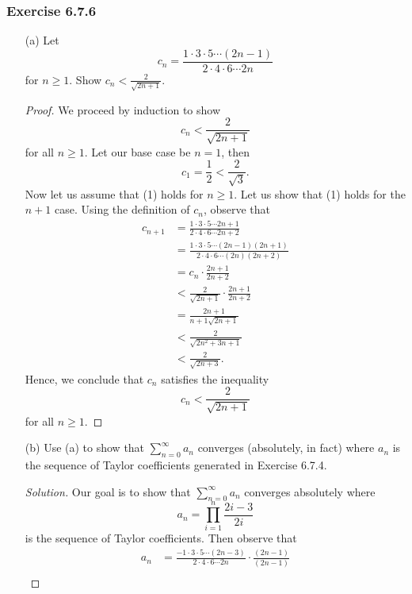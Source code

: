 \subsubsection{Exercise 6.7.6} 
\begin{enumerate}
    \item[(a)] Let 
        \[  c_{n} = \frac{ 1 \cdot 3 \cdot 5 \dotsb (2n-1) }{ 2 \cdot 4 \cdot 6 \dotsb 2n }  \] for \( n \geq 1  \). Show \( c_{n} < \frac{ 2 }{ \sqrt{ 2n+1 }  }. \)
        \begin{proof}
        We proceed by induction to show 
        \[  c_{n} < \frac{ 2  }{ \sqrt{ 2n+1 }  } \tag{1}  \] for all \( n \geq 1  \). Let our base case be \( n = 1  \), then 
        \[  c_{1} = \frac{ 1 }{ 2 } < \frac{ 2 }{ \sqrt{ 3 } }. \]
        Now let us assume that (1) holds for \( n \geq 1  \). Let us show that (1) holds for the \( n+1 \) case. Using the definition of \( c_{n} \), observe that
        \begin{align*}
            c_{n+1} &= \frac{ 1 \cdot 3 \cdot 5 \dotsb 2n+1 }{ 2 \cdot 4 \cdot 6 \dotsb 2n+2 }  \\
                    &= \frac{ 1 \cdot 3 \cdot 5 \dotsb (2n-1)(2n+1) }{ 2 \cdot 4 \cdot 6 \dotsb (2n)(2n+2) } \\
                    &= c_{n} \cdot \frac{ 2n+1 }{ 2n+2 } \\
                    &< \frac{ 2 }{ \sqrt{ 2n+1 }  } \cdot \frac{ 2n+1 }{ 2n+2 } \\
                    &= \frac{ 2n+1 }{ n+1 \sqrt{ 2n+1 }  } \\
                    &< \frac{ 2 }{ \sqrt{ 2n^2 + 3n + 1  }  } \\
                    &< \frac{ 2 }{ \sqrt{ 2n+3 }  }.
        \end{align*}
        Hence, we conclude that \( c_n  \) satisfies the inequality
        \[  c_{n} < \frac{ 2 }{ \sqrt{ 2n+1 }  }\]
        for all \( n \geq 1  \).
        \end{proof}
    \item[(b)] Use (a) to show that \( \sum_{ n=0  }^{ \infty  } a_n  \) converges (absolutely, in fact) where \( a_{n} \) is the sequence of Taylor coefficients generated in Exercise 6.7.4.
        \begin{proof}[Solution]
        Our goal is to show that \( \sum_{ n=0 }^{ \infty  } a_n  \) converges absolutely where 
        \[  a_{n}= \prod_{i=1}^{n} \frac{ 2i-3 }{ 2i } \]
        is the sequence of Taylor coefficients. Then observe that
        \begin{align*} a_{n} &= \frac{-1 \cdot 3 \cdot 5 \dotsb (2n-3)   }{ 2 \cdot 4 \cdot 6 \dotsb 2n} \cdot \frac{ (2n-1) }{  (2n-1) } \\ 

\end{align*}
\end{proof}
\end{enumerate}
